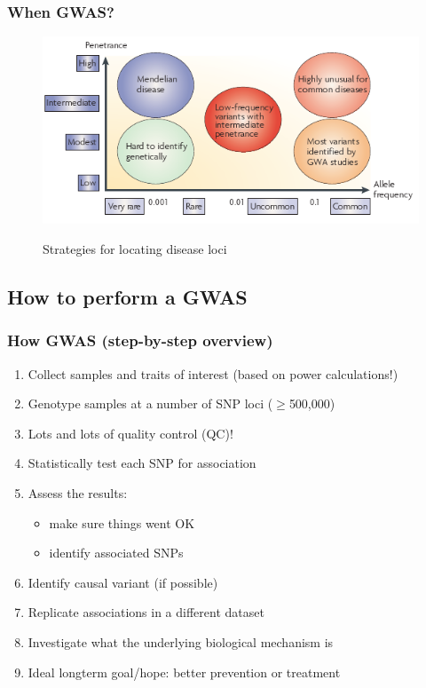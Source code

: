 \documentclass[xcolor=pdftex,dvipsnames,table,10pt]{beamer}
\begin{document}
\begin{frame}
  \frametitle{When GWAS?}
\vspace{-.1cm}
  \small 
    \begin{figure}
      \scalebox{0.70} {
        \includegraphics{AssoTypes.png}
      }
\caption{Strategies for locating disease loci}
  \end{figure}
\end{frame}

\subsection{How to perform a GWAS}
\begin{frame}
\vspace{-.5cm}
  \frametitle{How GWAS (step-by-step overview)}
 \small 
  \begin{enumerate}
 \item Collect samples and traits of interest (based on power calculations!)%
  \item Genotype samples at a number of SNP loci ($\geq$500,000) 
  \item Lots and lots of quality control (QC)!
  \item Statistically test each SNP for association
\item Assess the results: 
\begin{itemize}
\item make sure things went OK 
\item identify associated SNPs
    \end{itemize}  
\item	Identify causal variant (if possible)
\item	Replicate associations in a different dataset
\item Investigate what the underlying biological mechanism is
\item Ideal longterm goal/hope: better prevention or treatment
  \end{enumerate}
\end{frame}
\end{document}
